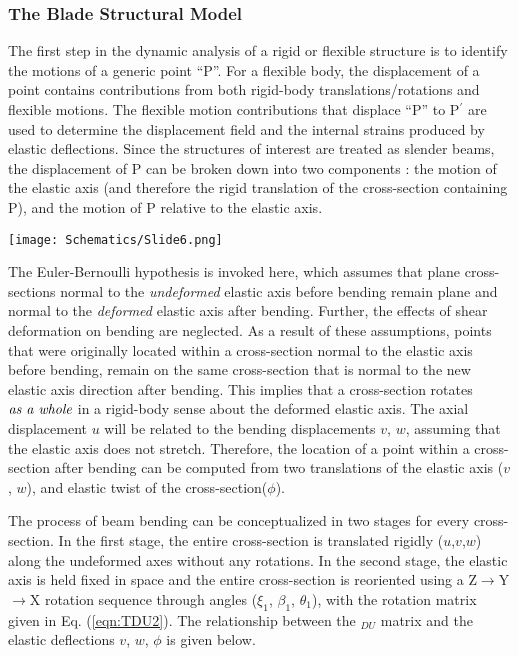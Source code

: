 \subsubsection{The Blade Structural Model}
\label{sec:strloads}
The first step in the dynamic analysis of a rigid or flexible structure is to identify the motions of a generic point ``P''. For a flexible body, the displacement of a point contains contributions from both rigid-body translations/rotations and flexible motions. The flexible motion contributions that displace ``P'' to P$^\prime$ are used to determine the displacement field and the internal strains produced by elastic deflections. Since the structures of interest are treated as slender beams, the displacement of P can be broken down into two components : the motion of the elastic axis (and therefore the rigid translation of the cross-section containing P), and the motion of P relative to the elastic axis. 
\begin{Figure}
 \centering
 \texttt{[image: Schematics/Slide6.png]}
 \vspace{-0.5cm}
\end{Figure}
\vspace{0.5cm}

The Euler-Bernoulli hypothesis is invoked here, which assumes that plane cross-sections normal to the \emph{undeformed} elastic axis before bending remain plane and normal to the \emph{deformed} elastic axis after bending. Further, the effects of shear deformation on bending are neglected. As a result of these assumptions, points that were originally located within a cross-section normal to the elastic axis before bending, remain on the same cross-section that is normal to the new elastic axis direction after bending. This implies that a cross-section rotates $\emph{as a whole}$ in a rigid-body sense about the deformed elastic axis. The axial displacement $u$ will be related to the bending displacements $v$, $w$, assuming that the elastic axis does not stretch. Therefore, the location of a point within a cross-section after bending can be computed from two translations of the elastic axis ($v$, $w$), and elastic twist of the cross-section($\phi$). 

The process of beam bending can be conceptualized in two stages for every cross-section. In the first stage, the entire cross-section is translated rigidly ($u$,$v$,$w$) along the undeformed axes  without any rotations. In the second stage, the elastic axis is held fixed in space and the entire cross-section is reoriented using a Z$\rightarrow$Y$\rightarrow$X rotation sequence through angles ($\xi_1$, $\beta_1$, $\theta_1$), with the rotation matrix given in Eq. (\ref{eqn:TDU2}). The relationship between the \tee$_{DU}$ matrix and the elastic deflections $v$, $w$, $\phi$ is given below.

